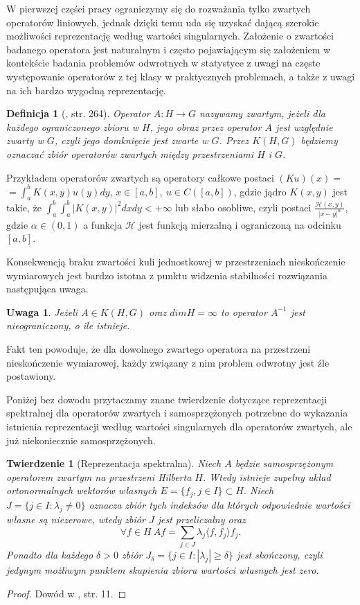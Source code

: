 \documentclass[man,mfiu]{mgrwms}
\newtheorem{tw}{Twierdzenie}[chapter]
\newtheorem{df}{Definicja}[chapter]
\newtheorem{uw}{Uwaga}[chapter]
\begin{document}
W pierwszej części pracy ograniczymy się do rozważania tylko zwartych operatorów liniowych, jednak dzięki temu uda się uzyskać dającą szerokie możliwości reprezentację według wartości singularnych. Założenie o zwartości badanego operatora jest naturalnym i często pojawiającym się założeniem w kontekście badania problemów odwrotnych w statystyce z uwagi na częste występowanie operatorów z tej klasy w praktycznych problemach, a także z uwagi na ich bardzo wygodną reprezentację. 

\begin{df}[\cite{hindus}, str. 264]
Operator $A\colon H \to G$ nazywamy zwartym, jeżeli dla każdego ograniczonego zbioru w $H$, jego obraz przez operator $A$ jest względnie zwarty w $G$, czyli jego domknięcie jest zwarte w $G$. Przez $K(H,G)$ będziemy oznaczać zbiór operatorów zwartych między przestrzeniami $H$ i $G$.
\end{df}

Przykładem operatorów zwartych są operatory całkowe postaci $\left(Ku\right)(x)=$\\$=\int_a^bK(x,y)u(y)dy$, $x\in [a,b],\ u\in C([a,b])$, gdzie jądro $K(x,y)$ jest takie, że $\int_a^b\int_a^b|K(x,y)|^2dxdy<+\infty$ lub słabo osobliwe, czyli postaci $\frac{\mathcal{H}(x,y)}{|x-y|^{\alpha}}$, gdzie $\alpha\in (0,1)$ a funkcja $\mathcal{H}$ jest funkcją mierzalną i ograniczoną na odcinku $[a,b]$.

Konsekwencją braku zwartości kuli jednostkowej w przestrzeniach nieskończenie wymiarowych jest bardzo istotna z punktu widzenia stabilności rozwiązania następująca uwaga.
\begin{uw}
Jeżeli $A\in K(H,G)$ oraz $dimH=\infty$ to operator $A^{-1}$ jest nieograniczony, o ile istnieje.
\end{uw}
Fakt ten powoduje, że dla dowolnego zwartego operatora na przestrzeni nieskończenie wymiarowej, każdy związany z nim problem odwrotny jest źle postawiony.

Poniżej bez dowodu przytaczamy znane twierdzenie dotyczące reprezentacji spektralnej dla operatorów zwartych i samosprzężonych potrzebne do wykazania istnienia reprezentacji według wartości singularnych dla operatorów zwartych, ale już niekoniecznie samosprzężonych.

\begin{tw}[Reprezentacja spektralna]
Niech $A$ będzie samosprzężonym operatorem zwartym na przestrzeni Hilberta $H$. Wtedy istnieje zupełny układ ortonormalnych wektorów własnych $E=\{f_j,j\in I\}\subset H$. Niech $J=\{j\in I\colon\lambda_j\neq 0\}$ oznacza zbiór tych indeksów dla których odpowiednie wartości własne są niezerowe, wtedy zbiór $J$ jest przeliczalny oraz 
\begin{displaymath}
\forall f\in H\ Af=\sum_{j\in J}\lambda_j\langle f,f_j\rangle f_j.
\end{displaymath}
Ponadto dla każdego $\delta>0$ zbiór $J_{\delta}=\{j\in I\colon |\lambda_j|\geq \delta\}$ jest skończony, czyli jedynym możliwym punktem skupienia zbioru wartości własnych jest zero.
\end{tw}
\begin{proof}
Dowód w \cite{iphde}, str. 11.
\end{proof}
\end{document}
